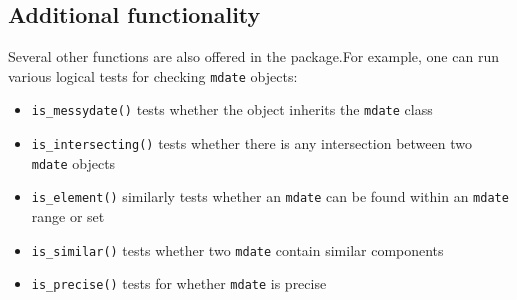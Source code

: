 \documentclass[
]{jss}
\providecommand{\tightlist}{%
  \setlength{\itemsep}{0pt}\setlength{\parskip}{0pt}}
\begin{document}
\hypertarget{additional-functionality}{%
\subsection{Additional functionality}\label{additional-functionality}}

Several other functions are also offered in the 
package.For example, one can run various logical tests for checking
\texttt{mdate} objects:

\begin{itemize}
\tightlist
\item
  \texttt{is\_messydate()} tests whether the object inherits the
  \texttt{mdate} class
\item
  \texttt{is\_intersecting()} tests whether there is any intersection
  between two \texttt{mdate} objects
\item
  \texttt{is\_element()} similarly tests whether an \texttt{mdate} can
  be found within an \texttt{mdate} range or set
\item
  \texttt{is\_similar()} tests whether two \texttt{mdate} contain
  similar components
\item
  \texttt{is\_precise()} tests for whether \texttt{mdate} is precise
\end{itemize}
\end{document}
